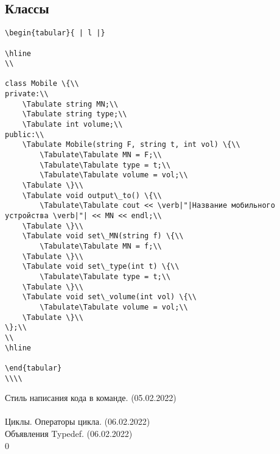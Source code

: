 \documentclass{article}
\begin{document}
\subsection{Классы}
\begin{lstlisting}
\begin{tabular}{ | l |}

\hline
\\

class Mobile \{\\
private:\\
    \Tabulate string MN;\\
    \Tabulate string type;\\
    \Tabulate int volume;\\
public:\\
    \Tabulate Mobile(string F, string t, int vol) \{\\
        \Tabulate\Tabulate MN = F;\\
        \Tabulate\Tabulate type = t;\\
        \Tabulate\Tabulate volume = vol;\\
    \Tabulate \}\\
    \Tabulate void output\_to() \{\\
        \Tabulate\Tabulate cout << \verb|"|Название мобильного устройства \verb|"| << MN << endl;\\
    \Tabulate \}\\
    \Tabulate void set\_MN(string f) \{\\
        \Tabulate\Tabulate MN = f;\\
    \Tabulate \}\\
    \Tabulate void set\_type(int t) \{\\
        \Tabulate\Tabulate type = t;\\
    \Tabulate \}\\
    \Tabulate void set\_volume(int vol) \{\\
        \Tabulate\Tabulate volume = vol;\\
    \Tabulate \}\\
\};\\
\\
\hline

\end{tabular}
\\\\
\end{lstlisting}
\newpage
\begin{thebibliography}{1}
Стиль написания кода в команде. (05.02.2022)\\ [https://doka.guide/js/code-style/]\\
Циклы. Операторы цикла. (06.02.2022)\\
[https://www.bestprog.net/ru/2017/09/04/cycles-operators-of-the-cycle-for-while-do-while\_ru/]
Объявления Typedef. (06.02.2022)\\
[https://docs.microsoft.com/ru-ru/cpp/c-language/typedef-declarations?view=msvc-16]0\\
\end{thebibliography}

\end{document}
